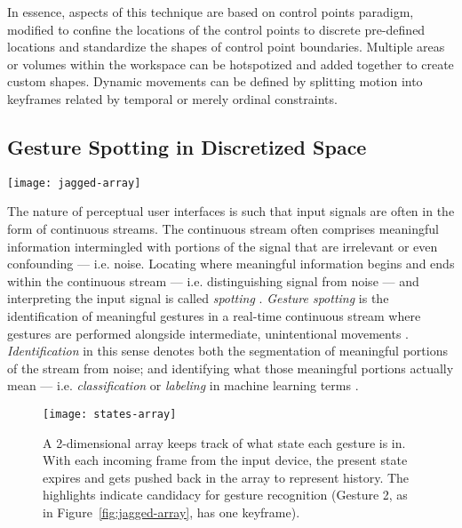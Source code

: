 In essence, aspects of this technique are based on  control points paradigm, modified to confine the locations of the control points to discrete pre-defined locations and standardize the shapes of control point boundaries. Multiple areas or volumes within the workspace can be hotspotized and added together to create custom shapes. Dynamic movements can be defined by splitting motion into keyframes related by temporal or merely ordinal constraints.

\subsection{Gesture Spotting in Discretized Space}

\begin{SCfigure}[3][t]
\centering
\texttt{[image: jagged-array]}
\caption{A jagged array used to keep a memory of how tracked limbs traverse hotspots. The elements of the outer array are arrays that correspond to the gestures that the system can recognize. The elements of the inner arrays keep track of when the tracked limb last occupied the hotspots that belong to each keyframe of gesture.}
\label{fig:jagged-array}
\end{SCfigure}

The nature of perceptual user interfaces is such that input signals are often in the form of continuous streams. The continuous stream often comprises meaningful information intermingled with portions of the signal that are irrelevant or even confounding --- i.e. noise. Locating where meaningful information begins and ends within the continuous stream --- i.e. distinguishing signal from noise --- and interpreting the input signal is called \emph{spotting} \parencite{Rose:1992}. \emph{Gesture spotting} is the identification of meaningful gestures in a real-time continuous stream where gestures are performed alongside intermediate, unintentional movements \parencite{Malgireddy:2010, Kang:2004, Lee:1999, Alon:2009, Elmezain:2010}. \emph{Identification} in this sense denotes both the segmentation of meaningful portions of the stream from noise; and identifying what those meaningful portions actually mean --- i.e. \emph{classification} or \emph{labeling} in machine learning terms \parencite{Malgireddy:2010, Alon:2009}.

\begin{figure}[b]
\centering
\texttt{[image: states-array]}
\caption{A 2-dimensional array keeps track of what state each gesture is in. With each incoming frame from the input device, the present state expires and gets pushed back in the array to represent history. The highlights indicate candidacy for gesture recognition (Gesture 2, as in Figure~\ref{fig:jagged-array}, has one keyframe).}
\label{fig:states-array}
\end{figure}

